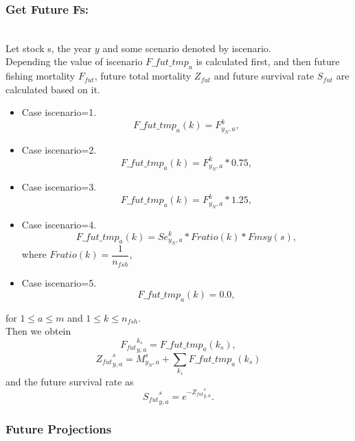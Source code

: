 \documentclass{article}
\begin{document}
\subsubsection{Get Future Fs:}\\
Let stock s, the year $y$ and some scenario denoted by iscenario.\\
Depending the value of iscenario $F\_fut\_tmp_a$ is calculated first, and then future fishing mortality $F_{fut}$, future total mortality $Z_{fut}$ and future survival rate $S_{fut}$ are calculated based on it.
\begin{itemize}
    \item Case iscenario=1. \begin{equation}
        F\_fut\_tmp_a(k)=F^k_{y_N,a}, 
        \end{equation}
    \item Case iscenario=2.  \begin{equation}
        F\_fut\_tmp_a(k) = F^k_{y_N,a}*0.75,  
    \end{equation}
    \item Case iscenario=3.  \begin{equation}
        F\_fut\_tmp_a(k) = F^{k}_{y_N,a}*1.25, 
    \end{equation}
    \item Case iscenario=4.
    \begin{equation}
        F\_fut\_tmp_a(k)=Se^k_{y_N,a}*Fratio(k)*Fmsy(s),
    \end{equation}
    where $Fratio(k)=\dfrac{1}{n_{fsh}}$,
    \item Case iscenario=5.
    \begin{equation}
        F\_fut\_tmp_a(k) = 0.0,
    \end{equation}
\end{itemize}
for $1\leq a \leq m$ and  $1\leq k \leq n_{fsh}$.\\

Then we obtein
\begin{equation}
    {F_{fut}}^{k_s}_{y,a}   = F\_fut\_tmp_a({k_s}),
\end{equation}
\begin{equation}
    {Z_{fut}}^s_{y,a}=M^s_{y_N,a}+\sum_{k_s}F\_fut\_tmp_a(k_s)
\end{equation}
and the future survival rate as
\begin{equation}
    {S_{fut}}^s_{y,a}=e^{-{Z_{fut}}^s_{y,a}}.
\end{equation}


\subsubsection{Future Projections}\\
\end{document}
